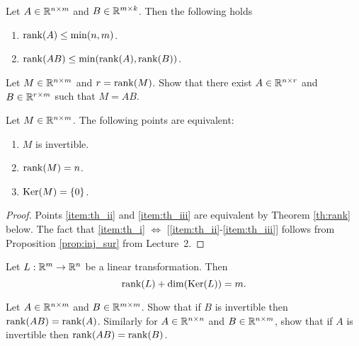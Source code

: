 \documentclass[11pt,nocut]{article}
\begin{document}
\begin{proposition}
	Let $A \in \mathbb{R}^{n \times m}$ and $B \in \mathbb{R}^{m \times k}$. Then the following holds
	\begin{enumerate}[label=(\roman*)]
		\item ${{\rm rank}}(A) \leq \min(n,m)$.
		\item ${{\rm rank}}(AB) \leq \min({{\rm rank}}(A),{{\rm rank}}(B))$.
	\end{enumerate}
\end{proposition}

\begin{exercise}[Important]
	Let $M \in \mathbb{R}^{n \times m}$ and $r = {{\rm rank}}(M)$. Show that there exist $A \in \mathbb{R}^{n \times r}$ and $B \in \mathbb{R}^{r \times m}$ such that $M = AB$.
\end{exercise}
\begin{theorem}
	Let $M \in \mathbb{R}^{n \times m}$. The following points are equivalent:
	\begin{enumerate}[label=(\roman*)]
		\item \label{item:th_i} $M$ is invertible.
		\item \label{item:th_ii} ${{\rm rank}}(M) = n$.
		\item \label{item:th_iii} ${{\rm Ker}}(M) = \{0\}$.
	\end{enumerate}
\end{theorem}
\begin{proof}
	Points \ref{item:th_ii} and \ref{item:th_iii} are equivalent by Theorem \ref{th:rank} below. The fact that \ref{item:th_i} $\Leftrightarrow$ [\ref{item:th_ii}-\ref{item:th_iii}] follows from Proposition \ref{prop:inj_sur} from Lecture~2.
\end{proof}

\begin{theorem}\label{th:rank}
	Let $L: \mathbb{R}^m \to \mathbb{R}^n$ be a linear transformation. Then
	$$
	{{\rm rank}}(L) + {{\rm dim}}({{\rm Ker}}(L)) = m.
	$$
\end{theorem}

\begin{exercise}
	Let $A \in \mathbb{R}^{n \times m}$ and $B \in \mathbb{R}^{m \times m}$. Show that if $B$ is invertible then ${{\rm rank}}(AB) = {{\rm rank}}(A)$.
	Similarly for $A \in \mathbb{R}^{n \times n}$ and $B \in \mathbb{R}^{n \times m}$, show that if $A$ is invertible then ${{\rm rank}}(AB) = {{\rm rank}}(B)$.
\end{exercise}
\end{document}
